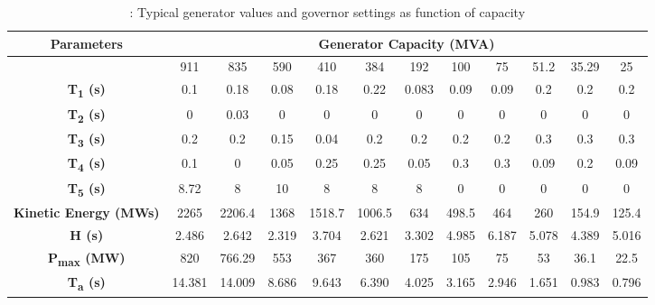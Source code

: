 \begin{table}[h]
	\caption{\label{tb:timeconstant}: Typical generator values and governor settings as function of capacity \cite{Anderson.2002}}
	\begin{adjustbox}{width=\textwidth, center}
		
	\begin{tabular}{cccccccccccc}
		\toprule
		\textbf{Parameters}	& \multicolumn{11}{c}{\textbf{Generator Capacity (MVA)}} \\
		
		\midrule
		{} & 911&	835&	590&	410&	384&	192&	100&	75&	51.2&	35.29&	25 \\
		\midrule

		\textbf{T\textsubscript{1} (s)}&	0.1&	0.18&	0.08&	0.18&	0.22&	0.083&	0.09&	0.09&	0.2&	0.2&	0.2\\
		\textbf{T\textsubscript{2} (s)}&	0&	0.03&	0&	0&	0&	0&	0&	0&	0&	0&	0\\
		\textbf{T\textsubscript{3} (s)}&	0.2&	0.2&	0.15&	0.04&	0.2&	0.2&	0.2&	0.2&	0.3&	0.3&	0.3\\
		\textbf{T\textsubscript{4} (s)}&	0.1&	0&	0.05&	0.25&	0.25&	0.05&	0.3&	0.3&	0.09&	0.2&	0.09\\
		\textbf{T\textsubscript{5} (s)}&	8.72&	8&	10&	8&	8&	8&	0&	0&	0&	0&	0\\
		\textbf{Kinetic Energy (MWs)}&	2265&	2206.4&	1368&	1518.7&	1006.5&	634	&498.5&	464&	260&	154.9&	125.4\\
		\textbf{H (s)}&	2.486&	2.642&	2.319&	3.704&	2.621&	3.302&	4.985&	6.187&	5.078&	4.389&	5.016\\
		\textbf{P\textsubscript{max} (MW)}&	820&	766.29&	553&	367&	360&	175&	105&	75&	53&	36.1&	22.5\\
		\textbf{T\textsubscript{a}  (s)}&	14.381&	14.009&	8.686&	9.643&	6.390&	4.025&	3.165&	2.946&	1.651&	0.983&	0.796\\
		\bottomrule
	\end{tabular}
	\end{adjustbox}
\end{table}






